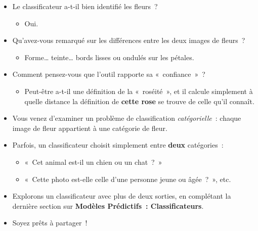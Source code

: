 \documentclass[12pt,a4paper]{article}
\begin{document}
\begin{itemize}
  \item Le classificateur a-t-il bien identifié les fleurs~?
  \begin{itemize}
    \item Oui.
  \end{itemize}
  \item Qu'avez-vous remarqué sur les différences entre les deux images de fleurs~?
  \begin{itemize}
    \item Forme\ldots{} teinte\ldots{} bords lisses ou ondulés sur les pétales.
  \end{itemize}
  \item Comment pensez-vous que l'outil rapporte sa «~confiance~»~?
  \begin{itemize}
    \item Peut-être a-t-il une définition de la «~roséité~», et il calcule simplement à quelle distance la définition de \textbf{cette rose} se trouve de celle qu'il connaît.
  \end{itemize}
\end{itemize}

\begin{itemize}
  \item Vous venez d'examiner un problème de classification \emph{catégorielle}~: chaque image de fleur appartient à une catégorie de fleur.
  \item Parfois, un classificateur choisit simplement entre \textbf{deux} catégories~:
  \begin{itemize}
    \item «~Cet animal est-il un chien ou un chat~?~»
    \item «~Cette photo est-elle celle d'une personne jeune ou âgée~?~», etc.
  \end{itemize}
  \item Explorons un classificateur avec plus de deux sorties, en complétant la dernière section sur \textbf{Modèles Prédictifs~: Classificateurs}.
  \item Soyez prêts à partager~!
\end{itemize}
\end{document}
